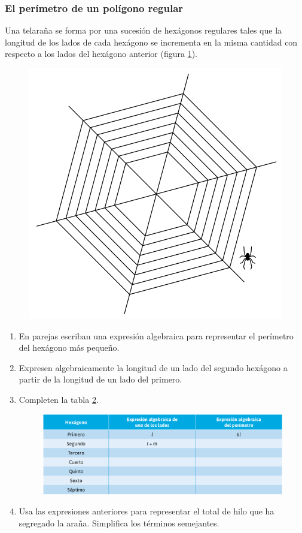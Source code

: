 \documentclass[11pt]{book}
\begin{document}
\begin{enumerate}
        \subsubsection{El perímetro de un polígono regular}
        Una telaraña se forma por una sucesión de hexágonos regulares tales que la longitud de los
        lados de cada hexágono se incrementa en la misma cantidad con respecto a los lados del
        hexágono anterior (figura \ref{fig:web}).
        \begin{figure}[H]
          \centering
          \includegraphics[width=.35\linewidth]{web.png}
          \label{fig:web}
        \end{figure}
        \begin{enumerate}
          \item En parejas escriban una expresión algebraica para representar
                el perímetro del hexágono más pequeño.
          \item Expresen algebraicamente la longitud de un lado del segundo
                hexágono a partir de la longitud de un lado del primero.
          \item Completen la tabla \ref{tab:tabla_web}.
                \begin{figure}[H]
                  \centering
                  \includegraphics[width=.75\linewidth]{tabla_web.png}
                  \label{tab:tabla_web}
                \end{figure}
          \item Usa las expresiones anteriores para representar el total de hilo que ha segregado
                la araña. Simplifica los términos semejantes.

\end{enumerate}
\end{enumerate}
\end{document}
